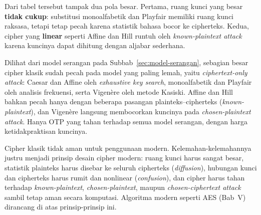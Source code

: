 Dari tabel tersebut tampak dua pola besar. Pertama, ruang kunci yang besar \textbf{tidak cukup}: substitusi monoalfabetik dan Playfair memiliki ruang kunci raksasa, tetapi tetap pecah karena statistik bahasa bocor ke cipherteks. Kedua, cipher yang \textbf{linear} seperti Affine dan Hill runtuh oleh \textit{known-plaintext attack} karena kuncinya dapat dihitung dengan aljabar sederhana.

Dilihat dari model serangan pada Subbab~\ref{sec:model-serangan}, sebagian besar cipher klasik sudah pecah pada model yang paling lemah, yaitu \textit{ciphertext-only attack}: Caesar dan Affine oleh \textit{exhaustive key search}, monoalfabetik dan Playfair oleh analisis frekuensi, serta Vigen\`{e}re oleh metode Kasiski. Affine dan Hill bahkan pecah hanya dengan beberapa pasangan plainteks--cipherteks (\textit{known-plaintext}), dan Vigen\`{e}re langsung membocorkan kuncinya pada \textit{chosen-plaintext attack}. Hanya OTP yang tahan terhadap semua model serangan, dengan harga ketidakpraktisan kuncinya.

\begin{konsep}
Cipher klasik tidak aman untuk penggunaan modern. Kelemahan-kelemahannya justru menjadi prinsip desain cipher modern: ruang kunci harus sangat besar, statistik plainteks harus disebar ke seluruh cipherteks (\textit{diffusion}), hubungan kunci dan cipherteks harus rumit dan nonlinear (\textit{confusion}), dan cipher harus tahan terhadap \textit{known-plaintext}, \textit{chosen-plaintext}, maupun \textit{chosen-ciphertext attack} sambil tetap aman secara komputasi. Algoritma modern seperti AES (Bab~V) dirancang di atas prinsip-prinsip ini.
\end{konsep}


